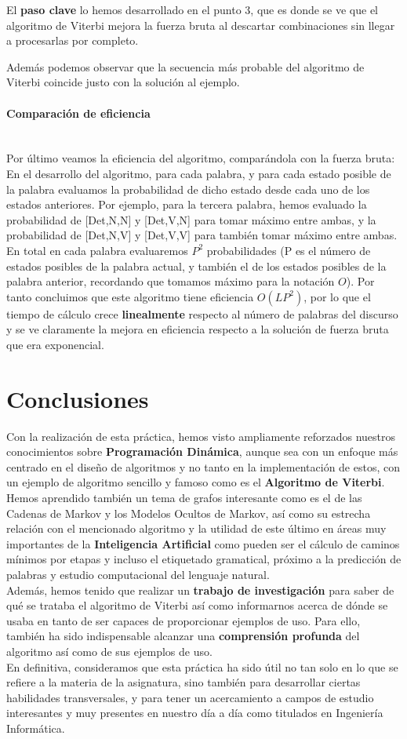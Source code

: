 \documentclass{article}
\newcommand{\myparagraph}[1]{\paragraph{#1}\mbox{}\\}
\begin{document}
El \textbf{paso clave} lo hemos desarrollado en el punto 3, que es donde se ve que el algoritmo de Viterbi mejora la fuerza bruta al descartar combinaciones sin llegar a procesarlas por completo.

Además podemos observar que la secuencia más probable del algoritmo de Viterbi coincide justo con la solución al ejemplo. 

\myparagraph{Comparación de eficiencia}

Por último veamos la eficiencia del algoritmo, comparándola con la fuerza bruta: 
En el desarrollo del algoritmo, para cada palabra, y para cada estado posible de la palabra evaluamos la probabilidad de dicho estado desde cada uno de los estados anteriores. Por ejemplo, para la tercera palabra, hemos evaluado la probabilidad de [Det,N,N] y [Det,V,N] para tomar máximo entre ambas, y la probabilidad de [Det,N,V] y [Det,V,V] para también tomar máximo entre ambas. En total en cada palabra evaluaremos $P^2$ probabilidades (P es el número de estados posibles de la palabra actual, y también el de los estados posibles de la palabra anterior, recordando que tomamos máximo para la notación $O$). Por tanto concluimos que este algoritmo tiene eficiencia $O(LP^2)$, por lo que el tiempo de cálculo crece \textbf{linealmente} respecto al número de palabras del discurso y se ve claramente la mejora en eficiencia respecto a la solución de fuerza bruta que era exponencial.

\newpage

\section{Conclusiones}

Con la realización de esta práctica, hemos visto ampliamente reforzados nuestros conocimientos sobre \textbf{Programación Dinámica}, aunque sea con un enfoque más centrado en el diseño de algoritmos y no tanto en la implementación de estos, con un ejemplo de algoritmo sencillo y famoso como es el \textbf{Algoritmo de Viterbi}. Hemos aprendido también un tema de grafos interesante como es el de las Cadenas de Markov y los Modelos Ocultos de Markov, así como su estrecha relación con el mencionado algoritmo y la utilidad de este último en áreas muy importantes de la \textbf{Inteligencia Artificial} como pueden ser el cálculo de caminos mínimos por etapas y incluso el etiquetado gramatical, próximo a la predicción de palabras y estudio computacional del lenguaje natural. \\

Además, hemos tenido que realizar un \textbf{trabajo de investigación} para saber de qué se trataba el algoritmo de Viterbi así como informarnos acerca de dónde se usaba en tanto de ser capaces de proporcionar ejemplos de uso. Para ello, también ha sido indispensable alcanzar una \textbf{comprensión profunda} del algoritmo así como de sus ejemplos de uso. \\

En definitiva, consideramos que esta práctica ha sido útil no tan solo en lo que se refiere a la materia de la asignatura, sino también para desarrollar ciertas habilidades transversales, y para tener un acercamiento a campos de estudio interesantes y muy presentes en nuestro día a día como titulados en Ingeniería Informática.
\end{document}
